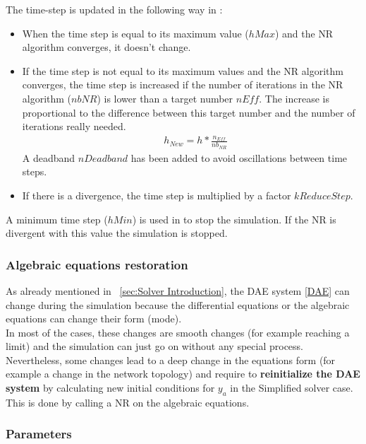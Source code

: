 \documentclass[a4paper, 12pt]{report}
\begin{document}
The time-step is updated in the following way in \Dynawo:
\begin{itemize}
\item When the time step is equal to its maximum value ($hMax$) and the \ac{NR} algorithm converges, it doesn't change.
\item If the time step is not equal to its maximum values and the \ac{NR} algorithm converges, the time step is increased if the number of iterations in the \ac{NR} algorithm ($nbNR$) is lower than a target number $nEff$. The increase is proportional to the difference between this target number and the number of iterations really needed.
\begin{equation}
\begin{aligned}
& h_{New} = h * \frac{n_{Eff}}{nb_{NR}}
\end{aligned}
\end{equation}
A deadband $nDeadband$ has been added to avoid oscillations between time steps.
\item If there is a divergence, the time step is multiplied by a factor $kReduceStep$.
\end{itemize}
A minimum time step ($hMin$) is used in \Dynawo to stop the simulation. If the \ac{NR} is divergent with this value the simulation is stopped. \\

\subsubsection{Algebraic equations restoration}

As already mentioned in ~\ref{sec:Solver Introduction}, the \ac{DAE} system \eqref{DAE} can change during the simulation because the differential equations or the algebraic equations can change their form (mode). \\

In most of the cases, these changes are smooth changes (for example reaching a limit) and the simulation can just go on without any special process. Nevertheless, some changes lead to a deep change in the  equations form (for example a change in the network topology) and require to \textbf{reinitialize the \ac{DAE} system} by calculating new initial conditions for $y_a$ in the Simplified solver case.
This is done by calling a \ac{NR} on the algebraic equations.

\subsubsection{Parameters}
\end{document}
